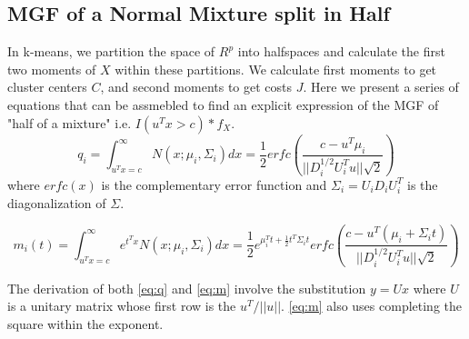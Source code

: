 \documentclass{article}
\begin{document}
\subsection{MGF of a Normal Mixture split in Half}
\quad In k-means, we partition the space of $R^p$ into halfspaces and calculate the first two moments of $X$ within these partitions. We calculate first moments to get cluster centers $C$, and second moments to get costs $J$. Here we present a series of equations that can be assmebled to find an explicit expression of the MGF of "half of a mixture" i.e. $I(u^Tx > c)*f_X$.
\begin{equation}
\label{eq:q}
q_i = \int_{u^Tx = c}^{\infty} N(x;\mu_i,\Sigma_i)dx = \frac{1}{2}erfc(\frac{c - u^T\mu_i}{||D_i^{1/2}U_i^Tu||\sqrt{2}})
\end{equation}
where $erfc(x)$ is the complementary error function and $\Sigma_i = U_iD_iU_i^T $ is the diagonalization of $\Sigma$.

\begin{equation}
\label{eq:m}
m_i(t) = \int_{u^Tx=c}^{\infty} e^{t^Tx}N(x;\mu_i,\Sigma_i)dx = \frac{1}{2}e^{\mu_i^Tt + \frac{1}{2}t^T\Sigma_i t}erfc(\frac{c-u^T(\mu_i+\Sigma_i t)}{||D_i^{1/2}U_i^Tu||\sqrt{2}})
\end{equation}

\quad The derivation of both \ref{eq:q} and \ref{eq:m} involve the substitution $y=Ux$ where $U$ is a unitary matrix whose first row is the $u^T/||u||$. \ref{eq:m} also uses completing the square within the exponent. \\
\end{document}

